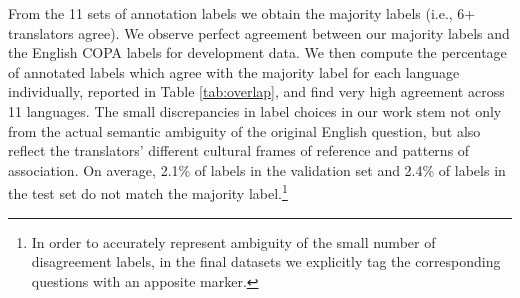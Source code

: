 \documentclass[11pt,a4paper]{article}
\begin{document}
From the 11 sets of annotation labels we obtain the majority labels (i.e., 6+ translators agree). We observe perfect agreement between our majority labels and the English COPA labels for development data. We then compute the percentage of annotated labels which agree with the majority label for each language individually, reported in Table \ref{tab:overlap}, and find very high agreement across 11 languages. The small discrepancies in label choices in our work stem not only from the actual semantic ambiguity of the original English question, but also reflect the translators' different cultural frames of reference and patterns of association. On average, 2.1\% of labels in the validation set and 2.4\% of labels in the test set do not match the majority label.\footnote{In order to accurately represent ambiguity of the small number of disagreement labels, in the final datasets we explicitly tag the corresponding questions with an apposite marker.} 


\iffalse
\end{document}
